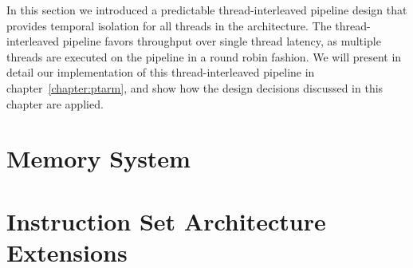 In this section we introduced a predictable thread-interleaved pipeline design that provides temporal isolation for all threads in the architecture.
The thread-interleaved pipeline favors throughput over single thread latency, as multiple threads are executed on the pipeline in a round robin fashion.  
We will present in detail our implementation of this thread-interleaved pipeline in chapter~\ref{chapter:ptarm}, and show how the design decisions discussed in this chapter are applied.

\section{Memory System}
\label{section:memory_system}


\section{Instruction Set Architecture Extensions}
\label{sec:programming_models}

